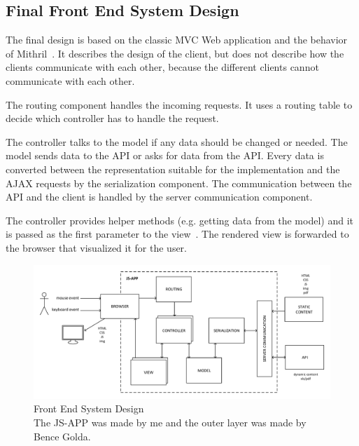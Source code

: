\subsection{Final Front End System Design}

The final design is based on the classic MVC Web application  and the behavior of Mithril~\cite{Mithril-getting-started}. It describes the design of the client, but does not describe how the clients communicate with each other, because the different clients cannot communicate with each other.

The routing component handles the incoming requests. It uses a routing table to decide which controller has to handle the request.

The controller talks to the model if any data should be changed or needed. The model sends data to the API or asks for data from the API. Every data is converted between the representation suitable for the implementation and the AJAX requests by the serialization component. The communication between the API and the client is handled by the server communication component.

The controller provides helper methods (e.g. getting data from the model) and it is passed as the first parameter to the view~\cite{Mithril-routing}. The rendered view is forwarded to the browser that visualized it for the user.

\newpage
\begin{landscape}
	\begin{figure}[!htbp]
		\centering
		\includegraphics[height=0.8\textwidth]{figures/frontend_rendszerterv.pdf}
		\caption[Front End System Design]{Front End System Design\\The JS-APP was made by me and the outer layer was made by Bence Golda.}
		\label{fig:frontend-system-design}
	\end{figure}
\end{landscape}
